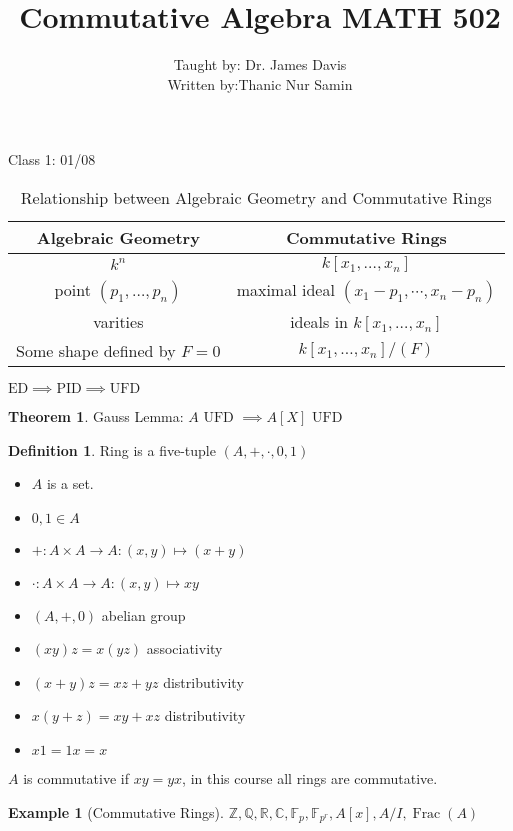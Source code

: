 \documentclass{article}
\title{Commutative Algebra MATH 502}
\author{Taught by: Dr. James Davis \\ Written by:Thanic Nur Samin}
\date{\vspace{-5ex}}
\theoremstyle{definition}
\newtheorem{example}{Example}
\newtheorem{definition}{Definition}
\newtheorem{theorem}{Theorem}
\newcommand{\Frac}{\operatorname{Frac}}
\begin{document}
\maketitle

Class 1: 01/08

\begin{table}[H]
    \centering
    \begin{tabular}{|c|c|}
        \toprule
            Algebraic Geometry &  Commutative Rings \\
        \midrule
            \(k^n\)  &  \(k[x_1, \dots, x_n ]\)  \\
            point \((p_1, \dots, p_n )\)  & maximal ideal \((x_1 - p_1,\cdots,x_n - p_n )\)  \\
            varities & ideals in \(k[x_1, \dots, x_n ]\)   \\
            Some shape defined by \(F=0\)  & \(k[x_1, \dots,x_n ]/(F)\)   \\
        \bottomrule
    \end{tabular}
    \caption{Relationship between Algebraic Geometry and Commutative Rings}
    \label{tab:algeocomring}
\end{table}

\(\text{ED} \implies \text{PID} \implies \text{UFD} \) 

\begin{theorem}
    Gauss Lemma: \(A \text{ UFD } \implies A[X] \text{ UFD} \) 
\end{theorem}

\begin{definition}
    Ring is a five-tuple \((A,+,\cdot,0,1)\) 
    \begin{itemize}
        
        \item \(A\) is a set.
        \item \(0,1\in A\) 
        \item \(+:A\times A \to A : (x,y) \mapsto (x+y)\)
        \item \(\cdot:A\times A\to A: (x,y)\mapsto xy\)
        \item \((A,+,0)\) abelian group
        \item \((xy)z=x(yz)\) associativity
        \item \((x+y)z=xz+yz\) distributivity
        \item \(x(y+z)=xy+xz\) distributivity
        \item \(x1=1x=x\)  
    \end{itemize}

    \(A\) is commutative if \(xy=yx\), in this course all rings are commutative.

    \begin{example}[Commutative Rings]
        \(\mathbb{Z},\mathbb{Q},\mathbb{R} ,\mathbb{C} ,\mathbb{F} _{p} ,\mathbb{F} _{p^r}, A[x],A/I,\Frac(A)\)         
    \end{example}

\end{definition}
\end{document}
